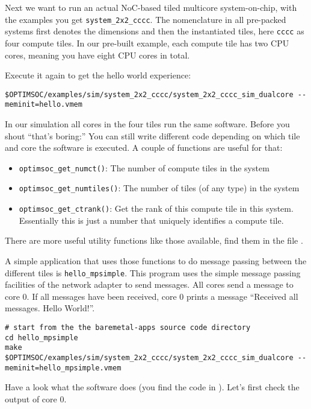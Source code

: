 Next we want to run an actual NoC-based tiled multicore system-on-chip,
with the examples you get \verb|system_2x2_cccc|. The nomenclature in
all pre-packed systems first denotes the dimensions and then the
instantiated tiles, here \verb|cccc| as four compute tiles.
In our pre-built example, each compute tile has two CPU cores, meaning you have eight CPU cores in total.

Execute it again to get the hello world experience:

\begin{lstlisting}
$OPTIMSOC/examples/sim/system_2x2_cccc/system_2x2_cccc_sim_dualcore --meminit=hello.vmem
\end{lstlisting}

In our simulation all cores in the four tiles run the same
software. Before you shout ``that's boring:'' You can still write
different code depending on which tile and core the software is
executed. A couple of functions are useful for that:

\begin{itemize}
  \item \verb|optimsoc_get_numct()|: The number of compute tiles in the system
  \item \verb|optimsoc_get_numtiles()|: The number of tiles (of any type) in
    the system
  \item \verb|optimsoc_get_ctrank()|: Get the rank of this compute tile in this
    system. Essentially this is just a number that uniquely identifies a
    compute tile.
\end{itemize}

There are more useful utility functions like those available, find them in the
file .

A simple application that uses those functions to do message passing between
the different tiles is \verb|hello_mpsimple|. This program uses
the simple message passing facilities of the network adapter to send messages.
All cores send a message to core 0. If all messages have been received, core 0
prints a message ``Received all messages. Hello World!''.

\begin{lstlisting}
# start from the the baremetal-apps source code directory
cd hello_mpsimple
make
$OPTIMSOC/examples/sim/system_2x2_cccc/system_2x2_cccc_sim_dualcore --meminit=hello_mpsimple.vmem
\end{lstlisting}

Have a look what the software does (you find the code in
). Let's
first check the output of core 0.


